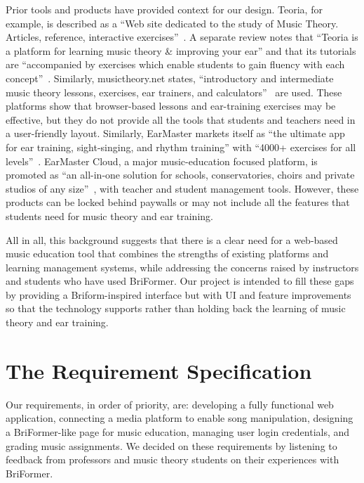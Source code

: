\documentclass[12pt, letterpaper]{article}
\begin{document}
Prior tools and products have provided context for our design. Teoria, for example, is described as a ``Web site dedicated to the study of Music Theory. Articles, reference, interactive exercises''~\cite{teoria-main}. A separate review notes that ``Teoria is a platform for learning music theory \& improving your ear'' and that its tutorials are ``accompanied by exercises which enable students to gain fluency with each concept''~\cite{teoria-review}. Similarly, musictheory.net states, ``introductory and intermediate music theory lessons, exercises, ear trainers, and calculators''~\cite{musictheory-main} are used. These platforms show that browser-based lessons and ear-training exercises may be effective, but they do not provide all the tools that students and teachers need in a user-friendly layout. Similarly, EarMaster markets itself as ``the ultimate app for ear training, sight-singing, and rhythm training'' with ``4000+ exercises for all levels''~\cite{earmaster-main}. EarMaster Cloud, a major music-education focused platform, is promoted as ``an all-in-one solution for schools, conservatories, choirs and private studios of any size''~\cite{earmaster-cloud}, with teacher and student management tools. However, these products can be locked behind paywalls or may not include all the features that students need for music theory and ear training.

All in all, this background suggests that there is a clear need for a web-based music education tool that combines the strengths of existing platforms and learning management systems, while addressing the concerns raised by instructors and students who have used BriFormer. Our project is intended to fill these gaps by providing a Briform-inspired interface but with UI and feature improvements so that the technology supports rather than holding back the learning of music theory and ear training.

\section*{The Requirement Specification}
Our requirements, in order of priority, are: developing a fully functional web application, connecting a media platform to enable song manipulation, designing a BriFormer-like page for music education, managing user login credentials, and grading music assignments. We decided on these requirements by listening to feedback from professors and music theory students on their experiences with BriFormer.
\end{document}
